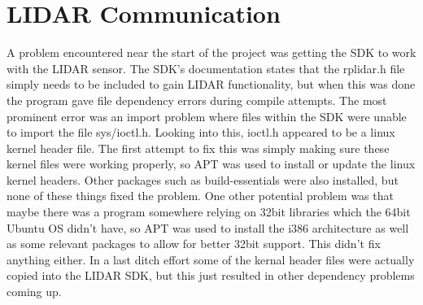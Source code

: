 	\section{LIDAR Communication}
	A problem encountered near the start of the project was getting the SDK to work with the LIDAR sensor. The SDK's documentation states that the rplidar.h file simply needs to be included to gain LIDAR functionality, but when this was done the program gave file dependency errors during compile attempts. The most prominent error was an import problem where files within the SDK were unable to import the file sys/ioctl.h. Looking into this, ioctl.h appeared to be a linux kernel header file. The first attempt to fix this was simply making sure these kernel files were working properly, so APT was used to install or update the linux kernel headers. Other packages such as build-essentials were also installed, but none of these things fixed the problem. One other potential problem was that maybe there was a program somewhere relying on 32bit libraries which the 64bit Ubuntu OS didn't have, so APT was used to install the i386 architecture as well as some relevant packages to allow for better 32bit support. This didn't fix anything either. In a last ditch effort some of the kernal header files were actually copied into the LIDAR SDK, but this just resulted in other dependency problems coming up.
	
